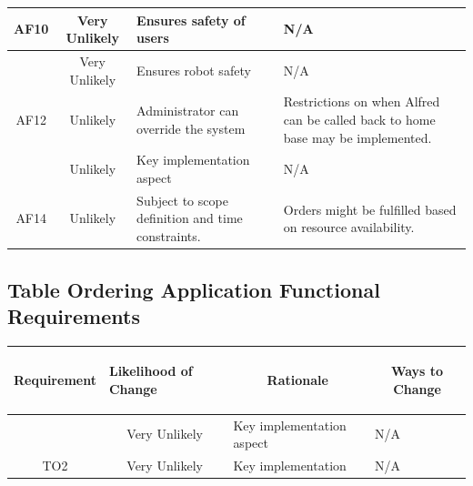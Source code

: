 \documentclass [11pt]{article}
\begin{document}
\begin{longtable}{| p{ } | p{ } |  p{ } | p{ } |}
\multicolumn{1}{|c|}{AF10}& 
\multicolumn{1}{|c|}{Very Unlikely} & Ensures safety of users & N/A \\ \hline

\rowcolor{tableCell} \multicolumn{1}{|c|}{AF11}& 
\multicolumn{1}{|c|}{Very Unlikely} & Ensures robot safety & N/A \\ \hline

\multicolumn{1}{|c|}{AF12}& 
\multicolumn{1}{|c|}{Unlikely} & Administrator can override the system & Restrictions on when Alfred can be called back to home base may be implemented. \\ \hline

\rowcolor{tableCell} \multicolumn{1}{|c|}{AF13}& 
\multicolumn{1}{|c|}{Unlikely} & Key implementation aspect & N/A \\ \hline

\multicolumn{1}{|c|}{AF14}& 
\multicolumn{1}{|c|}{Unlikely} & Subject to scope definition and time constraints. & Orders might be fulfilled based on resource availability. \\ \hline
\end{longtable}

\subsection{Table Ordering Application Functional Requirements} 

\begin{longtable}{| p{ } | p{ } |  p{ } | p{ } |}\hline 
\multicolumn{1}{|c|}{\textbf {Requirement}} & 
\begin{minipage}{.14 \columnwidth}\begin{center}\vspace{1.5mm}\textbf{Likelihood of Change}   \vspace{1.5mm} \end{center}\end{minipage}& 
\multicolumn{1}{c|}{\textbf {Rationale}} & \multicolumn{1}{c|}{\textbf {Ways to Change}} \\ \hline

\rowcolor{tableCell} \multicolumn{1}{|c|}{TO1}& 
\multicolumn{1}{|c|}{Very Unlikely} & Key implementation aspect & N/A \\ \hline

\multicolumn{1}{|c|}{TO2}& 
\multicolumn{1}{|c|}{Very Unlikely} & Key implementation & N/A \\ \hline
\end{longtable}
\end{document}
